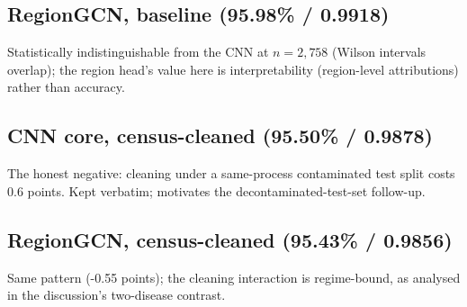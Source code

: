 \subsection{RegionGCN, baseline (95.98\% / 0.9918)}
Statistically indistinguishable from the CNN at $n=2{,}758$ (Wilson
intervals overlap); the region head's value here is interpretability
(region-level attributions) rather than accuracy.
\subsection{CNN core, census-cleaned (95.50\% / 0.9878)}
The honest negative: cleaning under a same-process contaminated test
split costs 0.6 points. Kept verbatim; motivates the
decontaminated-test-set follow-up.
\subsection{RegionGCN, census-cleaned (95.43\% / 0.9856)}
Same pattern (-0.55 points); the cleaning interaction is regime-bound, as
analysed in the discussion's two-disease contrast.
